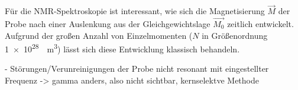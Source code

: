 Für die NMR-Spektroskopie ist interessant, wie sich die Magnetisierung $\vec{M}$
der Probe nach einer Auslenkung aus der Gleichgewichtslage $\vec{M_0}$
zeitlich entwickelt.
Aufgrund der großen Anzahl von Einzelmomenten
($N$ in Größenordnung \SI[retain-unity-mantissa=false]{1e28}{\per\cubic\meter})
lässt sich diese Entwicklung klassisch behandeln.



- Störungen/Verunreinigungen der Probe nicht resonant mit eingestellter Frequenz
  -> gamma anders, also nicht sichtbar, kernselektve Methode

